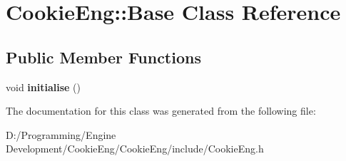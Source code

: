 \hypertarget{class_cookie_eng_1_1_base}{}\section{Cookie\+Eng\+:\+:Base Class Reference}
\label{class_cookie_eng_1_1_base}
\subsection*{Public Member Functions}
\begin{DoxyCompactItemize}
\item 
\mbox{\label{class_cookie_eng_1_1_base_a594218ffc91074966ac32835cb0ea1c6}} 
void {\bfseries initialise} ()
\end{DoxyCompactItemize}


The documentation for this class was generated from the following file\+:\begin{DoxyCompactItemize}
\item 
D\+:/\+Programming/\+Engine Development/\+Cookie\+Eng/\+Cookie\+Eng/include/Cookie\+Eng.\+h\end{DoxyCompactItemize}
